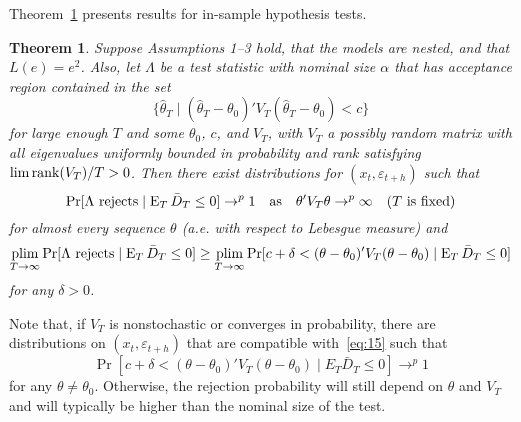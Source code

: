 \documentclass[11pt]{article}
\newcommand{\e}{\varepsilon}
\newtheorem{thm}{Theorem}
\begin{document}
Theorem~\ref{res:ftest} presents results for in-sample hypothesis
tests.
\begin{thm}\label{res:ftest}
  Suppose Assumptions 1--3 hold, that the models are nested, and that
  $L(e) = e^2$.  Also, let $\Lambda$ be a test statistic with nominal
  size $\alpha$ that has acceptance region contained in the set
  \[\{\hat{\theta}_T \mid (\hat{\theta}_T -
  \theta_0)'V_T(\hat{\theta}_T - \theta_0) < c \}\] for large enough
  $T$ and some $\theta_0$, $c$, and $V_T$, with $V_T$ a possibly
  random matrix with all eigenvalues uniformly bounded in probability
  and rank satisfying $\lim \operatorname*{rank}(V_T)/T > 0$.  Then there exist
  distributions for $(x_t, \e_{t+h})$ such that
  \begin{equation}
    \label{eq:11}
    \Pr[\Lambda \text{ rejects} \mid \operatorname{E}_T \bar{D}_{T} \leq 0] \to^p 1
    \quad \text{as} \quad
    \theta'V_T\theta \to^p \infty \quad \text{($T$ is fixed)}
  \end{equation}
  for almost every sequence $\theta$ (a.e. with respect to Lebesgue
  measure) and
  \begin{equation}
    \label{eq:15}
    \operatorname*{plim}_{T \to \infty} \Pr[\Lambda \text{ rejects} \mid
    \operatorname{E}_T \bar{D}_{T} \leq 0] \geq \operatorname*{plim}_{T \to \infty} \Pr[c + \delta < (\theta - \theta_0)' V_{T}
    (\theta - \theta_0) \mid \operatorname{E}_T \bar{D}_T \leq 0]
  \end{equation}
  for any $\delta > 0$.
\end{thm}
Note that, if $V_T$ is nonstochastic or converges in probability,
there are distributions on $(x_t, \e_{t+h})$ that are
compatible with~\eqref{eq:15} such that
\[\Pr[c + \delta < (\theta - \theta_0)'V_T (\theta - \theta_0) \mid
E_T \bar{D}_T \leq 0] \to^p 1
\]
for any $\theta \neq \theta_0$.  Otherwise, the rejection probability
will still depend on $\theta$ and $V_T$ and will typically be higher
than the nominal size of the test.
\end{document}
